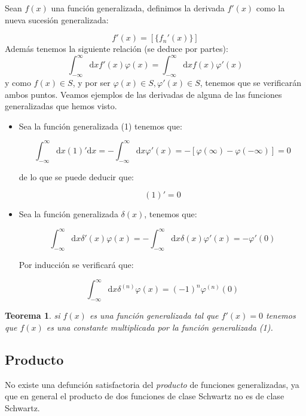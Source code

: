\documentclass[12pt]{book}
\newcommand{\D}{\mathrm{d}}
\newcommand{\inti}{\int_{-\infty}^{\infty}}
\newtheorem{theorem}{Teorema}[section]
\begin{document}
Sean $f(x)$ una función generalizada, definimos la derivada $f ' (x)$ como la nueva sucesión generalizada:

\begin{equation}
f '(x) = [ \{ f_n ' (x) \} ]
\end{equation}
Además tenemos la siguiente relación (se deduce por partes):
\begin{equation} \inti \D x f '(x) \varphi (x) = \inti \D x f(x) \varphi '(x) 
\end{equation}
y como $f(x) \in S$, y por ser $\varphi (x) \in S, \varphi' (x) \in S$, tenemos que se verificarán ambos puntos. Veamos ejemplos de las derivadas de alguna de las funciones generalizadas que hemos visto.

\begin{itemize}
\item Sea la función generalizada (1) tenemos que:

$$ \inti \D x (1)' \D x = - \inti \D x \varphi'(x) = - [\varphi(\infty) - \varphi (-\infty)] = 0  $$

de lo que se puede deducir que:

\begin{equation}
(1)' = 0
\end{equation}

\item Sea la función generalizada $\delta (x)$, tenemos que:

$$ \inti \D x \delta ' (x) \varphi (x) = - \inti \D x \delta (x) \varphi ' (x) = - \varphi ' (0) $$

Por inducción se verificará que:

\begin{equation}
\inti \D x \delta^{(n)} \varphi (x) = (-1)^n \varphi^{(n)} (0)
\end{equation}

\end{itemize}

\begin{theorem}
si $f(x)$ es una función generalizada tal que $f'(x)= 0$ tenemos que $f(x)$ es una constante multiplicada por la función generalizada (1).
\end{theorem}

\subsection{Producto}

No existe una defunción satisfactoria del \textit{producto} de funciones generalizadas, ya que en general el producto de dos funciones de clase Schwartz no es de clase Schwartz. 
\end{document}
